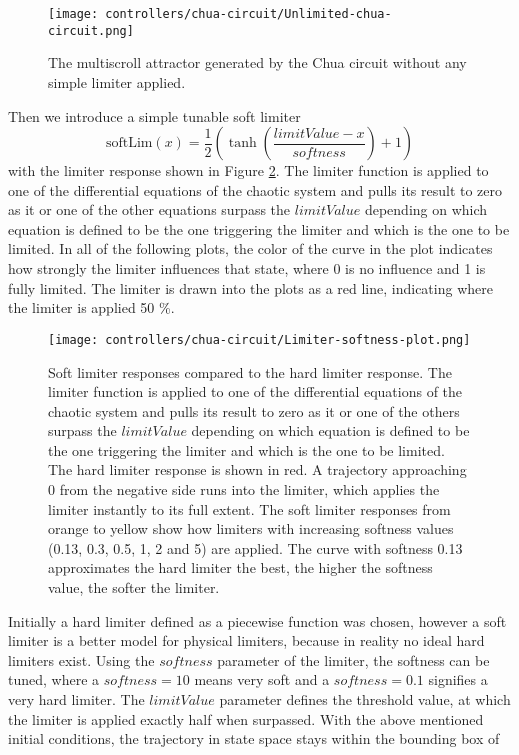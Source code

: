 \documentclass[main]{subfiles}
\begin{document}
\begin{figure}[H]
\centering
\texttt{[image: controllers/chua-circuit/Unlimited-chua-circuit.png]}
\caption[The multiscroll attractor in the Chua circuit]{The multiscroll attractor generated by the Chua circuit without any simple limiter applied.}
\label{figure:chaoticchuacircuit}
\end{figure}

Then we introduce a simple tunable soft limiter \[\text{softLim}(x) = \frac{1}{2} \left(\tanh\left(\frac{limitValue - x}{softness}\right) + 1\right)\] with the limiter response shown in Figure \ref{figure:softlimiterresponse}. %
%
The limiter function is applied to one of the differential equations of the chaotic system and pulls its result to zero as it or one of the other equations surpass the $limitValue$ depending on which equation is defined to be the one triggering the limiter and which is the one to be limited.
%
In all of the following plots, the color of the curve in the plot indicates how strongly the limiter influences that state, where 0 is no influence and 1 is fully limited. %
%
The limiter is drawn into the plots as a red line, indicating where the limiter is applied 50 \%. %

\begin{figure}[H]
\centering
\texttt{[image: controllers/chua-circuit/Limiter-softness-plot.png]}
\caption[Soft limiter responses]{Soft limiter responses compared to the hard limiter response. The limiter function is applied to one of the differential equations of the chaotic system and pulls its result to zero as it or one of the others surpass the $limitValue$ depending on which equation is defined to be the one triggering the limiter and which is the one to be limited. The hard limiter response is shown in red. A trajectory approaching 0 from the negative side runs into the limiter, which applies the limiter instantly to its full extent. The soft limiter responses from orange to yellow show how limiters with increasing softness values (0.13, 0.3, 0.5, 1, 2 and 5) are applied. The curve with softness 0.13 approximates the hard limiter the best, the higher the softness value, the softer the limiter.}
\label{figure:softlimiterresponse}
\end{figure}

Initially a hard limiter defined as a piecewise function was chosen, however a soft limiter is a better model for physical limiters, because in reality no ideal hard limiters exist. %
%
Using the $softness$ parameter of the limiter, the softness can be tuned, where a \(softness = 10\) means very soft and a \(softness = 0.1\) signifies a very hard limiter. %
%
The $limitValue$ parameter defines the threshold value, at which the limiter is applied exactly half when surpassed. %
%
With the above mentioned initial conditions, the trajectory in state space stays within the bounding box of 
\end{document}
